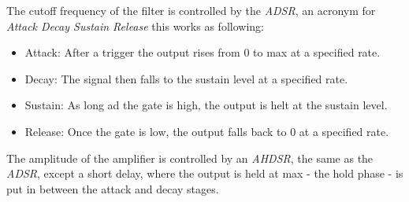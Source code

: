 The cutoff frequency of the filter is controlled by the \emph{ADSR}, an acronym
for \emph{Attack Decay Sustain Release} this works as following:
\begin{itemize}
  \item Attack: After a trigger the output rises from 0
to max at a specified rate.
  \item Decay: The signal then falls to the sustain level at a specified rate.
  \item Sustain: As long ad the gate is high, the output is helt at the sustain
  level.
  \item Release: Once the gate is low, the output falls back to 0 at a specified
  rate.
\end{itemize}

The amplitude of the amplifier is controlled by an \emph{AHDSR}, the same as the
\emph{ADSR}, except a short delay, where the output is held at max - the hold
phase - is put in between the attack and decay stages.
 